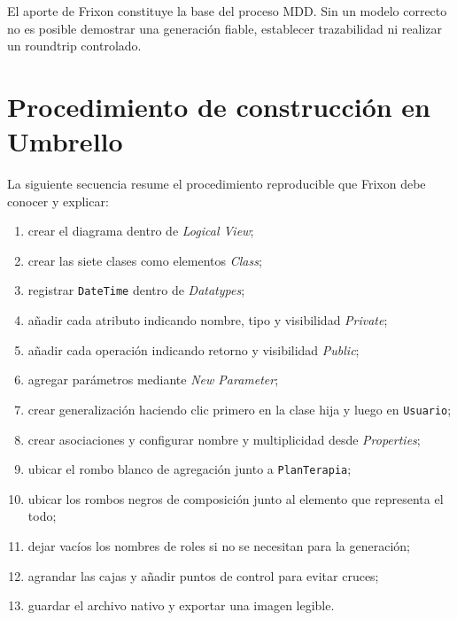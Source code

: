 El aporte de Frixon constituye la base del proceso MDD. Sin un modelo correcto no es posible demostrar una generación fiable, establecer trazabilidad ni realizar un roundtrip controlado.


\appendices
\section{Procedimiento de construcción en Umbrello}
La siguiente secuencia resume el procedimiento reproducible que Frixon debe conocer y explicar:
\begin{enumerate}
  \item crear el diagrama dentro de \textit{Logical View};
  \item crear las siete clases como elementos \textit{Class};
  \item registrar \texttt{DateTime} dentro de \textit{Datatypes};
  \item añadir cada atributo indicando nombre, tipo y visibilidad \textit{Private};
  \item añadir cada operación indicando retorno y visibilidad \textit{Public};
  \item agregar parámetros mediante \textit{New Parameter};
  \item crear generalización haciendo clic primero en la clase hija y luego en \texttt{Usuario};
  \item crear asociaciones y configurar nombre y multiplicidad desde \textit{Properties};
  \item ubicar el rombo blanco de agregación junto a \texttt{PlanTerapia};
  \item ubicar los rombos negros de composición junto al elemento que representa el todo;
  \item dejar vacíos los nombres de roles si no se necesitan para la generación;
  \item agrandar las cajas y añadir puntos de control para evitar cruces;
  \item guardar el archivo nativo y exportar una imagen legible.
\end{enumerate}

